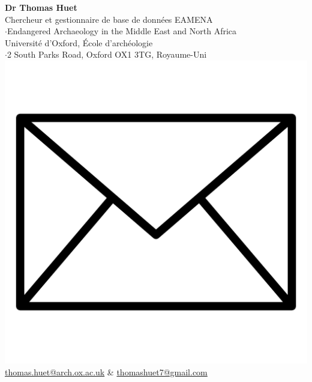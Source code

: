 \documentclass{article}
\begin{document}
\large{\textbf{Dr Thomas Huet}}\\
\normalsize
Chercheur et gestionnaire de base de données EAMENA\\
\small
$\cdot$Endangered Archaeology in the Middle East and North Africa\\
\normalsize
Université d'Oxford, École d'archéologie\\
\small
$\cdot$2 South Parks Road, Oxford OX1 3TG, Royaume-Uni
\normalsize
\\
\includegraphics[scale=0.025]{gmail} \quad \href{mailto:thomas.huet@arch.ox.ac.uk}{thomas.huet@arch.ox.ac.uk} \& \href{mailto:thomashuet7@gmail.com}{thomashuet7@gmail.com}\\
\end{document}
